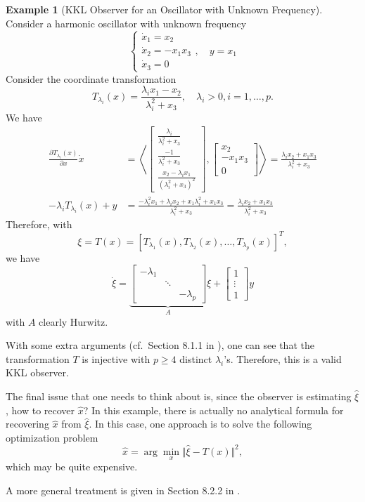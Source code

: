 \documentclass[
]{book}
\theoremstyle{definition}
\theoremstyle{definition}
\newtheorem{example}{Example}[chapter]
\theoremstyle{definition}
\theoremstyle{definition}
\theoremstyle{remark}
\begin{document}
\begin{example}[KKL Observer for an Oscillator with Unknown Frequency]
\protect\hypertarget{exm:kklOscillator}{}\label{exm:kklOscillator}Consider a harmonic oscillator with unknown frequency
\[
\begin{cases}
\dot{x}_1 = x_2 \\
\dot{x}_2 = - x_1 x_3 \\
\dot{x}_3 = 0
\end{cases}, \quad y = x_1
\]
Consider the coordinate transformation
\[
T_{\lambda_i} (x) = \frac{\lambda_i x_1 - x_2}{\lambda_i^2 + x_3}, \quad \lambda_i > 0, i=1,\dots,p.
\]
We have
\begin{align} 
\frac{\partial T_{\lambda_i}(x)}{\partial x} \dot{x} &= \left\langle \begin{bmatrix}
\frac{\lambda_i}{\lambda_i^2 + x_3} \\
\frac{-1 }{\lambda_i^2 + x_3} \\
\frac{x_2 - \lambda_i x_1}{(\lambda_i^2 + x_3)^2}
\end{bmatrix}, \begin{bmatrix}
x_2 \\ -x_1 x_3 \\ 0 \end{bmatrix}
\right \rangle = \frac{\lambda_i x_2 + x_1 x_3}{\lambda_i^2 + x_3} \\
-\lambda_i T_{\lambda_i}(x) + y &= \frac{-\lambda_i^2 x_1 + \lambda_i x_2 + x_1 \lambda_i^2 + x_1 x_3}{\lambda_i^2 + x_3} = \frac{\lambda_i x_2 + x_1 x_3}{\lambda_i^2 + x_3}
\end{align}
Therefore, with
\[
\xi = T(x) = [T_{\lambda_1}(x), T_{\lambda_2}(x),\dots,T_{\lambda_p}(x)]^T,
\]
we have
\[
\dot{\xi} = \underbrace{\begin{bmatrix}
- \lambda_1 & & \\
& \ddots & \\
 & & -\lambda_p \end{bmatrix}}_{A} \xi + \begin{bmatrix}1 \\ \vdots \\ 1 \end{bmatrix} y
\]
with \(A\) clearly Hurwitz.

With some extra arguments (cf.~Section 8.1.1 in \citep{bernard19book-observer}), one can see that the transformation \(T\) is injective with \(p \geq 4\) distinct \(\lambda_i\)'s. Therefore, this is a valid KKL observer.

The final issue that one needs to think about is, since the observer is estimating \(\hat{\xi}\), how to recover \(\hat{x}\)? In this example, there is actually no analytical formula for recovering \(\hat{x}\) from \(\hat{\xi}\). In this case, one approach is to solve the following optimization problem
\[
\hat{x} = \arg\min_{x} \Vert \hat{\xi} - T(x) \Vert^2,
\]
which may be quite expensive.

A more general treatment is given in Section 8.2.2 in \citep{bernard19book-observer}.
\end{example}
\end{document}
